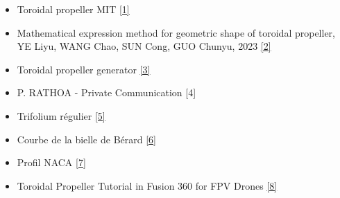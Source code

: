 \documentclass{article}
\begin{document}
\begin{itemize}
    \item Toroidal propeller MIT \href{https://www.ll.mit.edu/sites/default/files/other/doc/2023-02/TVO_Technology_Highlight_41_Toroidal_Propeller.pdf}{[1]}
    \item Mathematical expression method for geometric shape of toroidal propeller, YE Liyu, WANG Chao, SUN Cong, GUO Chunyu, 2023 \href{http://www.ship-research.com/cn/article/doi/10.19693/j.issn.1673-3185.03419}{[2]}
    \item Toroidal propeller generator \href{https://github.com/RaulBejarano/Ultimate-Toroidal-Propeller-Generator}{[3]}
    \item P. RATHOA - Private Communication [4]
    \item Trifolium régulier \href{https://mathcurve.com/courbes2d/trifoliumregulier/trifoliumregulier.shtml}{[5]}
    \item Courbe de la bielle de Bérard \href{https://mathcurve.com/courbes2d/bielledeberard/bielledeberard.shtml}{[6]}
    \item Profil NACA \href{https://fr.wikipedia.org/wiki/Profil_NACA}{[7]}
    \item Toroidal Propeller Tutorial in Fusion 360 for FPV Drones \href{https://www.youtube.com/watch?v=UUPffl7JxKw}{[8]}
\end{itemize}
\end{document}
